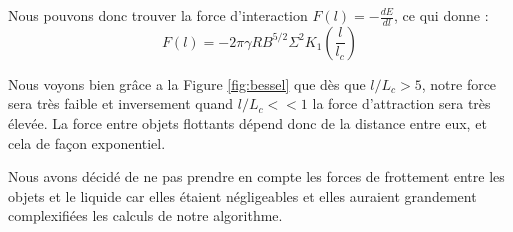         Nous pouvons donc trouver la force d'interaction $F(l)=-\frac{dE}{dl}$, ce qui donne :
        \begin{equation}
            \boxed{
                F(l)=-2\pi\gamma RB^{5/2}\Sigma^2K_1\left(\frac{l}{l_c}\right)
            }
            \label{eq:ForceInteraction}
        \end{equation}

        Nous voyons bien grâce a la Figure \ref{fig:bessel} que dès que $l/L_c>5$, notre force sera très faible et inversement quand $l/L_c << 1 $ la force d'attraction sera très élevée. La force entre objets flottants dépend donc de la distance entre eux, et cela de façon exponentiel.

        Nous avons décidé de ne pas prendre en compte les forces de frottement entre les objets et le liquide car elles étaient négligeables et elles auraient grandement complexifiées les calculs de notre algorithme.


